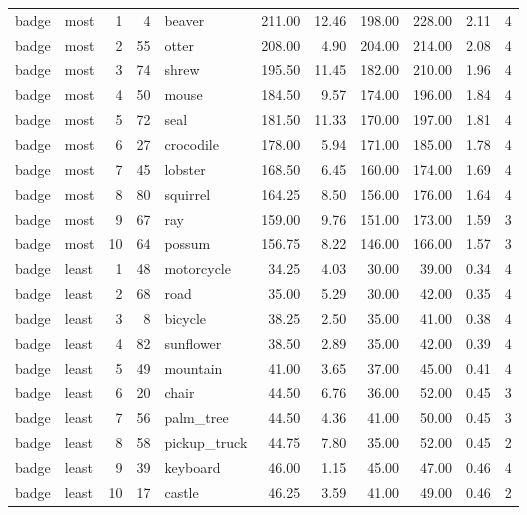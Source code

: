 \begin{tabular}{llrrlrrrrrr}
badge & most & 1 & 4 & beaver & 211.00 & 12.46 & 198.00 & 228.00 & 2.11 & 4 \\
badge & most & 2 & 55 & otter & 208.00 & 4.90 & 204.00 & 214.00 & 2.08 & 4 \\
badge & most & 3 & 74 & shrew & 195.50 & 11.45 & 182.00 & 210.00 & 1.96 & 4 \\
badge & most & 4 & 50 & mouse & 184.50 & 9.57 & 174.00 & 196.00 & 1.84 & 4 \\
badge & most & 5 & 72 & seal & 181.50 & 11.33 & 170.00 & 197.00 & 1.81 & 4 \\
badge & most & 6 & 27 & crocodile & 178.00 & 5.94 & 171.00 & 185.00 & 1.78 & 4 \\
badge & most & 7 & 45 & lobster & 168.50 & 6.45 & 160.00 & 174.00 & 1.69 & 4 \\
badge & most & 8 & 80 & squirrel & 164.25 & 8.50 & 156.00 & 176.00 & 1.64 & 4 \\
badge & most & 9 & 67 & ray & 159.00 & 9.76 & 151.00 & 173.00 & 1.59 & 3 \\
badge & most & 10 & 64 & possum & 156.75 & 8.22 & 146.00 & 166.00 & 1.57 & 3 \\
badge & least & 1 & 48 & motorcycle & 34.25 & 4.03 & 30.00 & 39.00 & 0.34 & 4 \\
badge & least & 2 & 68 & road & 35.00 & 5.29 & 30.00 & 42.00 & 0.35 & 4 \\
badge & least & 3 & 8 & bicycle & 38.25 & 2.50 & 35.00 & 41.00 & 0.38 & 4 \\
badge & least & 4 & 82 & sunflower & 38.50 & 2.89 & 35.00 & 42.00 & 0.39 & 4 \\
badge & least & 5 & 49 & mountain & 41.00 & 3.65 & 37.00 & 45.00 & 0.41 & 4 \\
badge & least & 6 & 20 & chair & 44.50 & 6.76 & 36.00 & 52.00 & 0.45 & 3 \\
badge & least & 7 & 56 & palm_tree & 44.50 & 4.36 & 41.00 & 50.00 & 0.45 & 3 \\
badge & least & 8 & 58 & pickup_truck & 44.75 & 7.80 & 35.00 & 52.00 & 0.45 & 2 \\
badge & least & 9 & 39 & keyboard & 46.00 & 1.15 & 45.00 & 47.00 & 0.46 & 4 \\
badge & least & 10 & 17 & castle & 46.25 & 3.59 & 41.00 & 49.00 & 0.46 & 2 \\
\bottomrule
\end{tabular}
